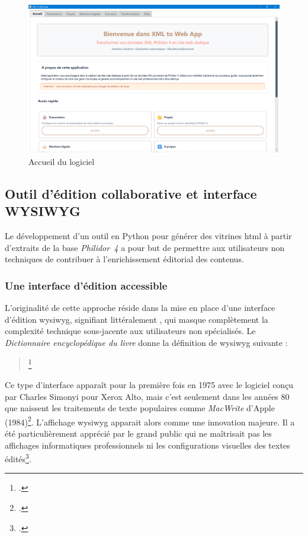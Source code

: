 \begin{figure}[h]
	\caption{Accueil du logiciel} \label{appli-accueil}
	\centering
	\includegraphics[width=\textwidth]{images/appli-accueil.png}
\end{figure}

\subsection{Outil d'édition collaborative et interface WYSIWYG}

Le développement d’un outil en Python pour générer des vitrines \gls{html} à partir d’extraits de la base \textit{Philidor~4} a pour but de permettre aux utilisateurs non techniques de contribuer à l’enrichissement éditorial des contenus.

\subsubsection{Une interface d'édition accessible}

L'originalité de cette approche réside dans la mise en place d'une interface d'édition \gls{wysiwyg}, signifiant littéralement , qui masque complètement la complexité technique sous-jacente aux utilisateurs non spécialisés. Le \textit{Dictionnaire encyclopédique du livre} donne la définition de \gls{wysiwyg} suivante :

\begin{quotation}
	\footcite{foucheDictionnaireEncyclopediqueLivre}
\end{quotation}

Ce type d'interface apparaît pour la première fois en 1975 avec le logiciel  conçu par Charles Simonyi pour Xerox Alto, mais c'est seulement dans les années 80 que naissent les traitements de texte populaires comme \textit{MacWrite} d'Apple (1984)\footcite{souchierChapitreNumeriqueEst2019}. L'affichage \gls{wysiwyg} apparait alors comme une innovation majeure. Il a été particulièrement apprécié par le grand public qui ne maîtrisait pas les affichages informatiques professionnels ni les configurations visuelles des textes édités\footcite{souchierChapitreNumeriqueEst2019}.

